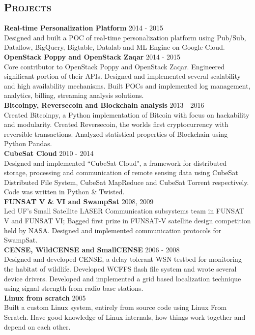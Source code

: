 \begin{resume}
\section{\textsc{Projects}}
\textbf{Real-time Personalization Platform} \hfill 2014 - 2015\\
Designed and built a POC of real-time personalization platform using Pub/Sub, Dataflow, BigQuery, Bigtable, Datalab and ML Engine on Google Cloud. \\
\textbf{OpenStack Poppy and OpenStack Zaqar} \hfill 2014 - 2015\\
Core contributor to OpenStack Poppy and OpenStack Zaqar. Engineered significant portion of their APIs. Designed and implemented several scalability and high availability mechanisms. Built POCs and implemented log management, analytics, billing, streaming analysis solutions.\\
\textbf{Bitcoinpy, Reversecoin and Blockchain analysis} \hfill 2013 - 2016\\
Created Bitcoinpy, a Python implementation of Bitcoin with focus on hackability and modularity. Created Reversecoin, the worlds first cryptocurrency with reversible transactions. Analyzed statistical properties of Blockchain using Python Pandas.\\
\textbf{CubeSat Cloud} \hfill 2010 - 2014 \\
Designed and implemented ``CubeSat Cloud", a framework for distributed storage, processing and communication of remote sensing data using CubeSat Distributed File System, CubeSat MapReduce and CubeSat Torrent respectively. Code was written in Python \& Twisted.\\
\textbf{FUNSAT V \& VI and SwampSat} \hfill 2008, 2009 \\
Led UF's Small Satellite LASER Communication subsystems team in FUNSAT V and FUNSAT VI; Bagged first prize in FUNSAT-V satellite design competition held by NASA. Designed and implemented communication protocols for SwampSat.\\
\textbf{CENSE, WildCENSE and SmallCENSE} \hfill 2006 - 2008\\
Designed and developed CENSE, a delay tolerant WSN testbed for monitoring the habitat of wildlife. Developed WCFFS flash file system and wrote several device drivers. Developed and implemented a grid based localization technique using signal strength from radio base stations.\\
\textbf{Linux from scratch} \hfill 2005 \\
Built a custom Linux system, entirely from source code using Linux From Scratch. Have good knowledge of Linux internals, how things work together and depend on each other.


\end{resume}
